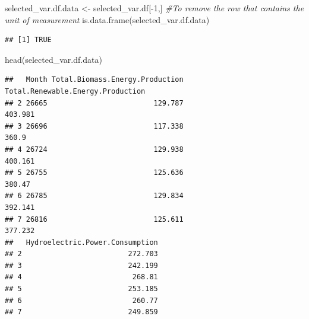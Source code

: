 \documentclass[
]{article}
\newenvironment{Shaded}{\begin{snugshade}}{\end{snugshade}}
\newcommand{\CommentTok}[1]{\textcolor[rgb]{0.56,0.35,0.01}{\textit{#1}}}
\newcommand{\DecValTok}[1]{\textcolor[rgb]{0.00,0.00,0.81}{#1}}
\newcommand{\FunctionTok}[1]{\textcolor[rgb]{0.00,0.00,0.00}{#1}}
\newcommand{\NormalTok}[1]{#1}
\newcommand{\OtherTok}[1]{\textcolor[rgb]{0.56,0.35,0.01}{#1}}
\newcommand{\SpecialCharTok}[1]{\textcolor[rgb]{0.00,0.00,0.00}{#1}}
\newcommand{\StringTok}[1]{\textcolor[rgb]{0.31,0.60,0.02}{#1}}
\begin{document}
\begin{Shaded}
\begin{Highlighting}[]
\NormalTok{selected\_var.df.data }\OtherTok{\textless{}{-}}\NormalTok{ selected\_var.df[}\SpecialCharTok{{-}}\DecValTok{1}\NormalTok{,]}
\CommentTok{\#To remove the row that contains the unit of measurement  }
\FunctionTok{is.data.frame}\NormalTok{(selected\_var.df.data)}
\end{Highlighting}
\end{Shaded}

\begin{verbatim}
## [1] TRUE
\end{verbatim}

\begin{Shaded}
\begin{Highlighting}[]
\FunctionTok{head}\NormalTok{(selected\_var.df.data)}
\end{Highlighting}
\end{Shaded}

\begin{verbatim}
##   Month Total.Biomass.Energy.Production Total.Renewable.Energy.Production
## 2 26665                         129.787                           403.981
## 3 26696                         117.338                             360.9
## 4 26724                         129.938                           400.161
## 5 26755                         125.636                            380.47
## 6 26785                         129.834                           392.141
## 7 26816                         125.611                           377.232
##   Hydroelectric.Power.Consumption
## 2                         272.703
## 3                         242.199
## 4                          268.81
## 5                         253.185
## 6                          260.77
## 7                         249.859
\end{verbatim}

\begin{Shaded}
\end{Shaded}
\end{document}

